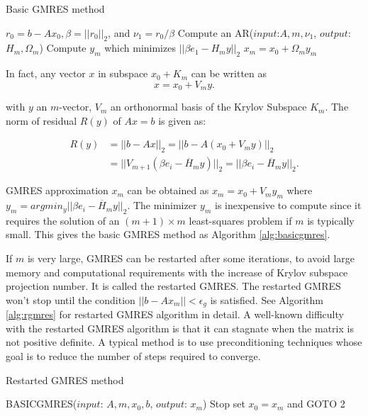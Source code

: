 \begin{algorithm}[htbp]
	\caption{Basic GMRES method}
	\label{alg:basicgmres}
	\begin{algorithmic}[1]
		\State $r_0=b-A x_0, \beta=||r_0||_2$, and $\nu_1=r_0/\beta$
		\State Compute an AR($input$:$A,m,\nu_1$, $output$: $H_m, \Omega_m$)
		\State Compute $y_m$ which minimizes $||\beta e_1-H_m y||_2$ \label{least squares in GMRES}
		\State $x_m=x_0+\Omega_my_m$
		\EndFunction
	\end{algorithmic}
\end{algorithm}

In fact, any vector $x$ in subspace $x_0+K_m$ can be written as 
\begin{equation}
x = x_0 + V_m y.
\end{equation}

with $y$ an $m$-vector, $V_m$ an orthonormal basis of the Krylov Subspace $K_m$. The norm of residual $R(y)$ of $Ax=b$ is given as:

\begin{equation}
\begin{aligned}
R(y) & = ||b-Ax||_2 =||b-A(x_0+V_m y)||_2 \\&= ||V_{m+1}(\beta e_i - \overline{H}_m y)||_2 = ||\beta e_i - \overline{H}_m y||_2.
\end{aligned}
\end{equation}

GMRES approximation $x_m$ can be obtained as $x_m = x_0+V_my_m$ where $y_m = argmin_y||\beta e_i - \overline{H}_m y||_2$. The minimizer $y_m$ is inexpensive to compute since it requires the solution of an $(m+1) \times m$ least-squares problem if $m$ is typically small. This gives the basic GMRES method as Algorithm \ref{alg:basicgmres}.

If $m$ is very large, GMRES can be restarted after some iterations, to avoid large memory and computational requirements with the increase of Krylov subspace projection number. It is called the restarted GMRES. The restarted GMRES won't stop until the condition $||b-Ax_m||<\epsilon_g$ is satisfied. See Algorithm \ref{alg:rgmres} for restarted GMRES algorithm in detail. A well-known difficulty with the restarted GMRES algorithm is that it can stagnate when the matrix is not positive definite. A typical method is to use preconditioning techniques whose goal is to reduce the number of steps required to converge.


\begin{algorithm}[htbp]
	\caption{Restarted GMRES method}
	\label{alg:rgmres}
	\begin{algorithmic}[1]
		\State BASICGMRES($input$: $A, m, x_0,b$, $output$: $x_m$)
		\State Stop
		\Else \State set $x_0 = x_m$ and GOTO 2
		\EndIf
		\EndFunction
	\end{algorithmic}
\end{algorithm}

